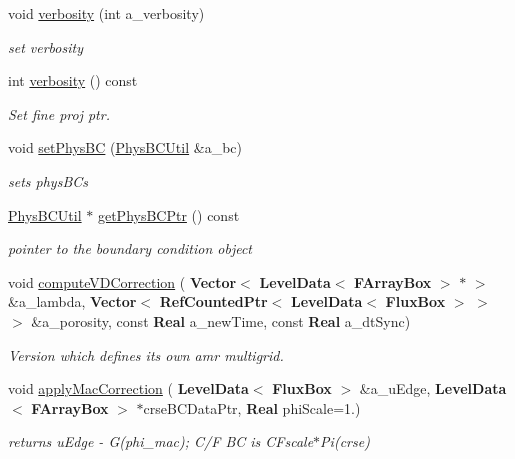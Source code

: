 \begin{DoxyCompactItemize}
void \hyperlink{class_projector_a423fb315802ec3c5bf95982bccb082ce}{verbosity} (int a\+\_\+verbosity)
\begin{DoxyCompactList}\small\item\em set verbosity \end{DoxyCompactList}\item 
int \hyperlink{class_projector_a4b633f9f7bf0f239e91050a577c0a29e}{verbosity} () const
\begin{DoxyCompactList}\small\item\em Set fine proj ptr. \end{DoxyCompactList}\item 
\mbox{\label{class_projector_a46ba32cacf31f39cb4e9bf7bdeb85d49}} 
void \hyperlink{class_projector_a46ba32cacf31f39cb4e9bf7bdeb85d49}{set\+Phys\+BC} (\hyperlink{class_phys_b_c_util}{Phys\+B\+C\+Util} \&a\+\_\+bc)
\begin{DoxyCompactList}\small\item\em sets phys\+B\+Cs \end{DoxyCompactList}\item 
\mbox{\label{class_projector_aa6952cbd9be6fee4abc5cfeb36a2de4a}} 
\hyperlink{class_phys_b_c_util}{Phys\+B\+C\+Util} $\ast$ \hyperlink{class_projector_aa6952cbd9be6fee4abc5cfeb36a2de4a}{get\+Phys\+B\+C\+Ptr} () const
\begin{DoxyCompactList}\small\item\em pointer to the boundary condition object \end{DoxyCompactList}\item 
\mbox{\label{class_projector_a2eb9b7b71f45168a9d6a94e878a601eb}} 
void \hyperlink{class_projector_a2eb9b7b71f45168a9d6a94e878a601eb}{compute\+V\+D\+Correction} (\textbf{ Vector}$<$ \textbf{ Level\+Data}$<$ \textbf{ F\+Array\+Box} $>$ $\ast$ $>$ \&a\+\_\+lambda, \textbf{ Vector}$<$ \textbf{ Ref\+Counted\+Ptr}$<$ \textbf{ Level\+Data}$<$ \textbf{ Flux\+Box} $>$ $>$ $>$ \&a\+\_\+porosity, const \textbf{ Real} a\+\_\+new\+Time, const \textbf{ Real} a\+\_\+dt\+Sync)
\begin{DoxyCompactList}\small\item\em Version which defines it\textquotesingle{}s own amr multigrid. \end{DoxyCompactList}\item 
void \hyperlink{class_projector_ad55a4e31a840ff9476db4a2b7b9833cb}{apply\+Mac\+Correction} (\textbf{ Level\+Data}$<$ \textbf{ Flux\+Box} $>$ \&a\+\_\+u\+Edge, \textbf{ Level\+Data}$<$ \textbf{ F\+Array\+Box} $>$ $\ast$crse\+B\+C\+Data\+Ptr, \textbf{ Real} phi\+Scale=1.)
\begin{DoxyCompactList}\small\item\em returns u\+Edge -\/ G(phi\+\_\+mac); C/F BC is C\+Fscale$\ast$\+Pi(crse) \end{DoxyCompactList}\end{DoxyCompactItemize}
